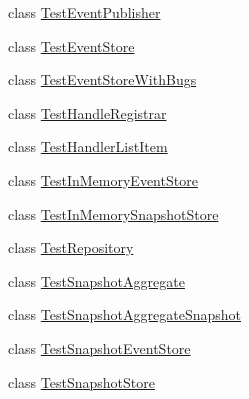 \begin{DoxyCompactItemize}
\item 
class \hyperlink{classCqrs_1_1Tests_1_1Substitutes_1_1TestEventPublisher}{Test\+Event\+Publisher}
\item 
class \hyperlink{classCqrs_1_1Tests_1_1Substitutes_1_1TestEventStore}{Test\+Event\+Store}
\item 
class \hyperlink{classCqrs_1_1Tests_1_1Substitutes_1_1TestEventStoreWithBugs}{Test\+Event\+Store\+With\+Bugs}
\item 
class \hyperlink{classCqrs_1_1Tests_1_1Substitutes_1_1TestHandleRegistrar}{Test\+Handle\+Registrar}
\item 
class \hyperlink{classCqrs_1_1Tests_1_1Substitutes_1_1TestHandlerListItem}{Test\+Handler\+List\+Item}
\item 
class \hyperlink{classCqrs_1_1Tests_1_1Substitutes_1_1TestInMemoryEventStore}{Test\+In\+Memory\+Event\+Store}
\item 
class \hyperlink{classCqrs_1_1Tests_1_1Substitutes_1_1TestInMemorySnapshotStore}{Test\+In\+Memory\+Snapshot\+Store}
\item 
class \hyperlink{classCqrs_1_1Tests_1_1Substitutes_1_1TestRepository}{Test\+Repository}
\item 
class \hyperlink{classCqrs_1_1Tests_1_1Substitutes_1_1TestSnapshotAggregate}{Test\+Snapshot\+Aggregate}
\item 
class \hyperlink{classCqrs_1_1Tests_1_1Substitutes_1_1TestSnapshotAggregateSnapshot}{Test\+Snapshot\+Aggregate\+Snapshot}
\item 
class \hyperlink{classCqrs_1_1Tests_1_1Substitutes_1_1TestSnapshotEventStore}{Test\+Snapshot\+Event\+Store}
\item 
class \hyperlink{classCqrs_1_1Tests_1_1Substitutes_1_1TestSnapshotStore}{Test\+Snapshot\+Store}
\end{DoxyCompactItemize}
